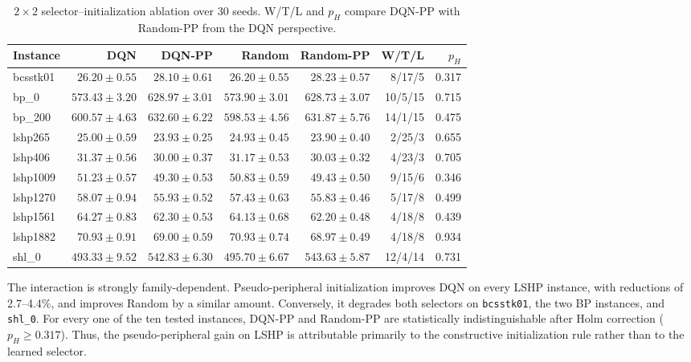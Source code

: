 \documentclass[runningheads]{llncs}
\begin{document}
\begin{table}[t]
\centering
\caption{$2\times2$ selector--initialization ablation over 30 seeds. W/T/L and $p_H$ compare DQN-PP with Random-PP from the DQN perspective.}
\label{tab:grid}
\scriptsize
\begin{tabular}{lrrrrrr}
\toprule
Instance & DQN & DQN-PP & Random & Random-PP & W/T/L & $p_H$\\
\midrule
bcsstk01 & $26.20\pm0.55$ & $28.10\pm0.61$ & $26.20\pm0.55$ & $28.23\pm0.57$ & 8/17/5 & 0.317\\
bp\_0 & $573.43\pm3.20$ & $628.97\pm3.01$ & $573.90\pm3.01$ & $628.73\pm3.07$ & 10/5/15 & 0.715\\
bp\_200 & $600.57\pm4.63$ & $632.60\pm6.22$ & $598.53\pm4.56$ & $631.87\pm5.76$ & 14/1/15 & 0.475\\
lshp265 & $25.00\pm0.59$ & $\mathbf{23.93\pm0.25}$ & $24.93\pm0.45$ & $\mathbf{23.90\pm0.40}$ & 2/25/3 & 0.655\\
lshp406 & $31.37\pm0.56$ & $\mathbf{30.00\pm0.37}$ & $31.17\pm0.53$ & $\mathbf{30.03\pm0.32}$ & 4/23/3 & 0.705\\
lshp1009 & $51.23\pm0.57$ & $\mathbf{49.30\pm0.53}$ & $50.83\pm0.59$ & $\mathbf{49.43\pm0.50}$ & 9/15/6 & 0.346\\
lshp1270 & $58.07\pm0.94$ & $\mathbf{55.93\pm0.52}$ & $57.43\pm0.63$ & $\mathbf{55.83\pm0.46}$ & 5/17/8 & 0.499\\
lshp1561 & $64.27\pm0.83$ & $\mathbf{62.30\pm0.53}$ & $64.13\pm0.68$ & $\mathbf{62.20\pm0.48}$ & 4/18/8 & 0.439\\
lshp1882 & $70.93\pm0.91$ & $\mathbf{69.00\pm0.59}$ & $70.93\pm0.74$ & $\mathbf{68.97\pm0.49}$ & 4/18/8 & 0.934\\
shl\_0 & $493.33\pm9.52$ & $542.83\pm6.30$ & $495.70\pm6.67$ & $543.63\pm5.87$ & 12/4/14 & 0.731\\
\bottomrule
\end{tabular}
\end{table}

The interaction is strongly family-dependent. Pseudo-peripheral initialization improves DQN on every LSHP instance, with reductions of 2.7--4.4\%, and improves Random by a similar amount. Conversely, it degrades both selectors on \texttt{bcsstk01}, the two BP instances, and \texttt{shl\_0}. For every one of the ten tested instances, DQN-PP and Random-PP are statistically indistinguishable after Holm correction ($p_H\geq0.317$). Thus, the pseudo-peripheral gain on LSHP is attributable primarily to the constructive initialization rule rather than to the learned selector.
\end{document}
